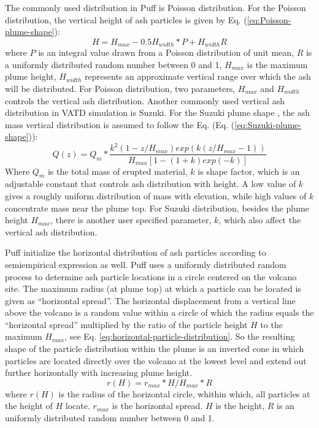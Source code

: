\documentclass[utf8]{frontiersSCNS} %
\begin{document}
The commonly used distribution in Puff is Poisson distribution. For the Poisson distribution, the vertical height of ash particles is given by Eq. (\ref{eq:Poisson-plume-shape}):
\begin{equation}
H=H_{max} - 0.5 H_{width}*P+H_{width}R
\label{eq:Poisson-plume-shape}
\end{equation}
where $P$ is an integral value drawn from a Poisson distribution of unit mean, $R$ is a uniformly distributed random number between 0 and 1, $H_{max}$ is the maximum plume height, $H_{width}$ represents an approximate vertical range over which the ash will be distributed. For Poisson distribution, two parameters, $H_{max}$ and $H_{width}$ controls the vertical ash distribution.
Another commonly used vertical ash distribution in VATD simulation is Suzuki. For the Suzuki plume shape \citep{suzuki1983theoretical}, the ash mass vertical distribution is assumed to follow the Eq. (Eq. (\ref{eq:Suzuki-plume-shape})):
\begin{equation}
Q(z)=Q_m* \frac{k^2(1-z/H_{max})exp\left(k(z/H_{max} -1 )\right)}{H_{max}\left[1-(1+k)exp(-k)\right]}
\label{eq:Suzuki-plume-shape}
\end{equation}
Where $Q_m$ is the total mass of erupted material, $k$ is shape factor, which is an adjustable constant that controls ash distribution with height. A low value of $k$ gives a roughly uniform distribution of mass with elevation, while high values of $k$ concentrate mass near the plume top.
For Suzuki distribution, besides the plume height $H_{max}$, there is another user specified parameter, $k$, which also affect the vertical ash distribution.

Puff initialize the horizontal distribution of ash particles according to semiempirical expression as well. Puff uses a uniformly distributed random process to determine ash particle locations in a circle centered on the volcano site. The maximum radius (at plume top) at which a particle can be located is given as ``horizontal spread''. The horizontal displacement from a vertical line above the volcano is a random value within a circle of which the radius equals the ``horizontal spread'' multiplied by the ratio of the particle height $H$ to the maximum $H_{max}$, see Eq. \ref{eq:horizontal-particle-distribution}. So the resulting shape of the particle distribution within the plume is an inverted cone in which particles are located directly over the volcano at the lowest level and extend out further horizontally with increasing plume height.
\begin{equation}
r(H)= r_{max} * H / H_{max} * R
\label{eq:horizontal-particle-distribution} 
\end{equation}
where $r(H)$ is the radius of the horizontal circle, whithin which, all particles at the height of $H$ locate. $r_{max}$ is the horizontal spread. $H$ is the height, $R$ is an uniformly distributed random number between 0 and 1.
\end{document}

